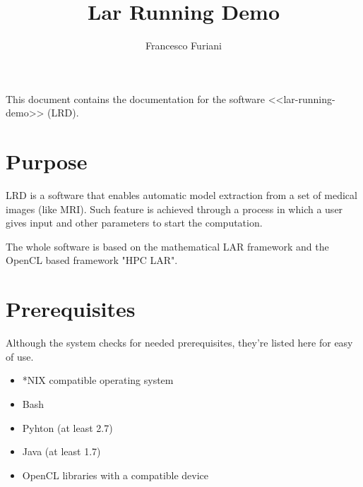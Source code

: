 \documentclass[a4paper,twoside,10pt]{report}
\begin{document}
\pagestyle{empty} %



\title{Lar Running Demo}
\author{Francesco Furiani}
\maketitle

\tableofcontents %
\cleardoublepage %

\pagestyle{plain} %




This document contains the documentation for the software <<lar-running-demo>> (LRD). 


\chapter{Purpose}\label{purpose}

LRD is a software that enables automatic model extraction from a set of medical images (like MRI). Such feature is achieved through a process in which a user gives input and other parameters to start the computation.

The whole software is based on the mathematical LAR framework\cite{dicarlo2013linear} and the OpenCL based framework "HPC LAR"\cite{Furiani2013}.

\chapter{Prerequisites}\label{prerequisites}

Although the system checks for needed prerequisites, they're listed here for easy of use.

\begin{itemize}
\item *NIX compatible operating system
\item Bash
\item Pyhton (at least 2.7)
\item Java (at least 1.7) \footnotemark[1]
\item OpenCL libraries with a compatible device \footnotemark[1]
\end{itemize}
\end{document}
